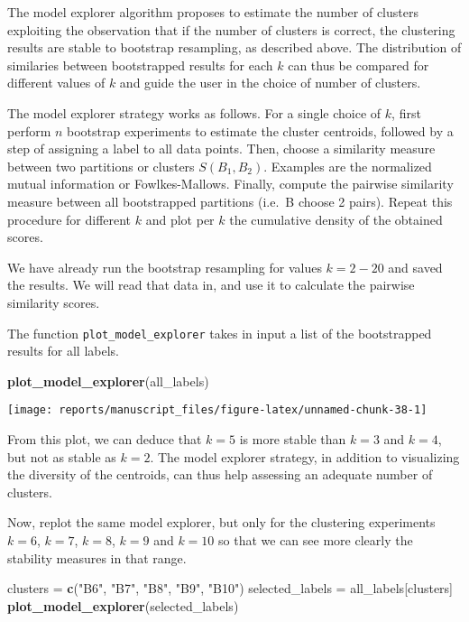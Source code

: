 \documentclass[9pt,a4paper,]{extarticle}
\newenvironment{Shaded}{\begin{snugshade}}{\end{snugshade}}
\newcommand{\KeywordTok}[1]{\textcolor[rgb]{0.13,0.29,0.53}{\textbf{#1}}}
\newcommand{\NormalTok}[1]{#1}
\newcommand{\StringTok}[1]{\textcolor[rgb]{0.31,0.60,0.02}{#1}}
\begin{document}
The model explorer algorithm \citep{ben-hur:stability} proposes to estimate the
number of clusters exploiting the observation that if the number of clusters
is correct, the clustering results are stable to bootstrap resampling, as
described above. The distribution of similaries between bootstrapped results
for each \(k\) can thus be compared for different values of \(k\) and guide the
user in the choice of number of clusters.

The model explorer strategy works as follows. For a single choice of \(k\),
first perform \(n\) bootstrap experiments to estimate the cluster centroids,
followed by a step of assigning a label to all data points. Then, choose a
similarity measure between two partitions or clusters \(S(B_1, B_2)\). Examples
are the normalized mutual information or Fowlkes-Mallows. Finally, compute the
pairwise similarity measure between all bootstrapped partitions (i.e.~B choose
2 pairs). Repeat this procedure for different \(k\) and plot per \(k\) the
cumulative density of the obtained scores.

We have already run the bootstrap resampling for values \(k=2-20\) and saved the
results. We will read that data in, and use it to calculate the pairwise
similarity scores.

The function \texttt{plot\_model\_explorer} takes in input a list of the bootstrapped
results for all labels.

\begin{Shaded}
\begin{Highlighting}[]
\KeywordTok{plot_model_explorer}\NormalTok{(all_labels)}
\end{Highlighting}
\end{Shaded}

\begin{center}\texttt{[image: reports/manuscript\_files/figure-latex/unnamed-chunk-38-1]} \end{center}

From this plot, we can deduce that \(k=5\) is more stable than \(k=3\) and \(k=4\),
but not as stable as \(k=2\). The model explorer strategy, in addition to
visualizing the diversity of the centroids, can thus help assessing an
adequate number of clusters.

Now, replot the same model explorer, but only for the clustering experiments
\(k=6\), \(k=7\), \(k=8\), \(k=9\) and \(k=10\) so that we can see more clearly the stability
measures in that range.

\begin{Shaded}
\begin{Highlighting}[]
\NormalTok{clusters =}\StringTok{ }\KeywordTok{c}\NormalTok{(}\StringTok{"B6"}\NormalTok{, }\StringTok{"B7"}\NormalTok{, }\StringTok{"B8"}\NormalTok{, }\StringTok{"B9"}\NormalTok{, }\StringTok{"B10"}\NormalTok{)}
\NormalTok{selected_labels =}\StringTok{ }\NormalTok{all_labels[clusters]}
\KeywordTok{plot_model_explorer}\NormalTok{(selected_labels)}
\end{Highlighting}
\end{Shaded}
\end{document}
